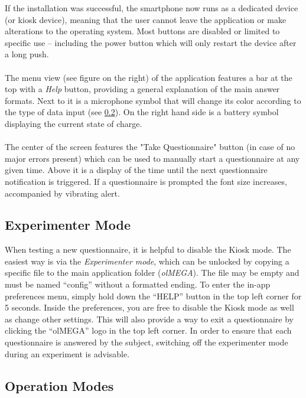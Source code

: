\documentclass[11pt,a4paper,titlepage]{article}
\begin{document}
If the installation was successful, the smartphone now runs as a dedicated device (or kiosk device), meaning that the user cannot leave the application or make alterations to the operating system. Most buttons are disabled or limited to specific use -- including the power button which will only restart the device after a long push.\\
\\
The menu view (see figure on the right) of the application features a bar at the top with a \textit{Help} button, providing a general explanation of the main answer formats. Next to it is a microphone symbol that will change its color according to the type of data input (see \ref{sub:operationmode}). On the right hand side is a battery symbol displaying the current state of charge.\\
\\
The center of the screen features the "Take Questionnaire" button (in case of no major errors present) which can be used to manually start a questionnaire at any given time. Above it is a display of the time until the next questionnaire notification is triggered. If a questionnaire is prompted the font size increases, accompanied by vibrating alert.


\subsection{Experimenter Mode}\label{sub:experimenter}

When testing a new questionnaire, it is helpful to disable the Kiosk mode. The easiest way is via the \textit{Experimenter mode}, which can be unlocked by copying a specific file to the main application folder (\textit{olMEGA}). The file may be empty and must be named ``config'' without a formatted ending. To enter the in-app preferences menu, simply hold down the ``HELP'' button in the top left corner for 5 seconds. Inside the preferences, you are free to disable the Kiosk mode as well as change other settings. This will also provide a way to exit a questionnaire by clicking the ``olMEGA'' logo in the top left corner. In order to ensure that each questionnaire is answered by the subject, switching off the experimenter mode during an experiment is advisable.


\newpage


\subsection{Operation Modes}\label{sub:operationmode}
\end{document}
